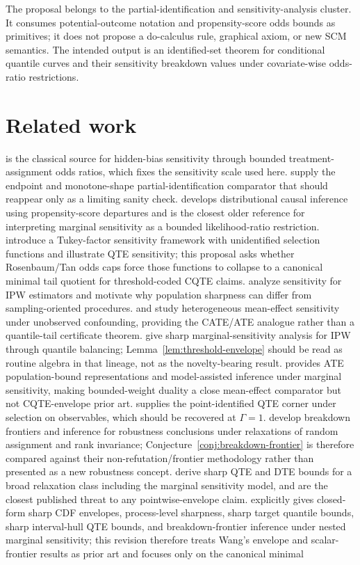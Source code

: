 \documentclass[11pt]{article}
\theoremstyle{definition}
\theoremstyle{plain}
\theoremstyle{remark}
\begin{document}
The proposal belongs to the partial-identification and sensitivity-analysis cluster.  It consumes potential-outcome notation and propensity-score odds bounds as primitives; it does not propose a do-calculus rule, graphical axiom, or new SCM semantics.  The intended output is an identified-set theorem for conditional quantile curves and their sensitivity breakdown values under covariate-wise odds-ratio restrictions.

\section{Related work}
\citet{Rosenbaum1995} is the classical source for hidden-bias sensitivity through bounded treatment-assignment odds ratios, which fixes the sensitivity scale used here.  \citet{ManskiPepper2000} supply the endpoint and monotone-shape partial-identification comparator that should reappear only as a limiting sanity check.  \citet{Tan2006} develops distributional causal inference using propensity-score departures and is the closest older reference for interpreting marginal sensitivity as a bounded likelihood-ratio restriction.  \citet{DAmourFranksFeller2020} introduce a Tukey-factor sensitivity framework with unidentified selection functions and illustrate QTE sensitivity; this proposal asks whether Rosenbaum/Tan odds caps force those functions to collapse to a canonical minimal tail quotient for threshold-coded CQTE claims.  \citet{ZhaoSmallBhattacharya2019} analyze sensitivity for IPW estimators and motivate why population sharpness can differ from sampling-oriented procedures.  \citet{KallusMaoZhou2019} and \citet{YadlowskyNamkoongBasuDuchiTian2022} study heterogeneous mean-effect sensitivity under unobserved confounding, providing the CATE/ATE analogue rather than a quantile-tail certificate theorem.  \citet{DornGuo2023} give sharp marginal-sensitivity analysis for IPW through quantile balancing; Lemma~\ref{lem:threshold-envelope} should be read as routine algebra in that lineage, not as the novelty-bearing result.  \citet{Tan2024} provides ATE population-bound representations and model-assisted inference under marginal sensitivity, making bounded-weight duality a close mean-effect comparator but not CQTE-envelope prior art.  \citet{Firpo2007} supplies the point-identified QTE corner under selection on observables, which should be recovered at \(\Gamma=1\).  \citet{MastenPoirier2020} develop breakdown frontiers and inference for robustness conclusions under relaxations of random assignment and rank invariance; Conjecture~\ref{conj:breakdown-frontier} is therefore compared against their non-refutation/frontier methodology rather than presented as a new robustness concept.  \citet{MastenPoirierRen2025} derive sharp QTE and DTE bounds for a broad relaxation class including the marginal sensitivity model, and are the closest published threat to any pointwise-envelope claim.  \citet{Wang2026} explicitly gives closed-form sharp CDF envelopes, process-level sharpness, sharp target quantile bounds, sharp interval-hull QTE bounds, and breakdown-frontier inference under nested marginal sensitivity; this revision therefore treats Wang's envelope and scalar-frontier results as prior art and focuses only on the canonical minimal 
\end{document}
